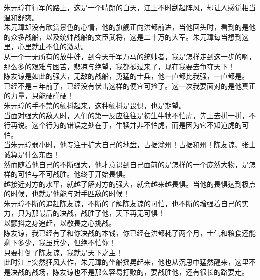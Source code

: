\begin{multicols}{\theparacolNo}
朱元璋在行军的路上，这是一个晴朗的白天，江上不时刮起阵风，却让人感觉相当温和舒爽。\\

朱元璋却没有欣赏景色的心情，他的旗舰正向洪都前进，当他回头时，看到的是他的众多战船，以及统帅战船的文臣武将，这是二十万的大军。朱元璋每当想到这里，心里就止不住的激动。\\

从一个一无所有的放牛娃，到今天千军万马的统帅者，我是怎样走到这一步的啊，那么多的艰难与困苦，悲凉与绝望，我都挺过来了，现在我要去争夺天下！\\

陈友谅是如此的强大，无敌的战船，勇猛的士兵，他一直都比我强，一直都是。\\

已经不是三年前了，已经没有伏击这样的便宜可捡了。这一次我要面对的是他真正的力量，只能硬碰硬！\\

朱元璋的手不禁的颤抖起来，这种颤抖是畏惧，也是期望。\\

当面对强大的敌人时，人们的第一反应往往是初生牛犊不怕虎，先上去拼一拼，不行再说。这个行为的错误之处在于，牛犊并非不怕虎，而是因为它不知道虎的可怕。\\

当朱元璋弱小时，他专注于扩大自己的地盘，占据滁州！占据和州！陈友谅、张士诚算是什么东西！\\

然而随着他自己的不断强大，他才意识到自己面前的是怎样的一个庞然大物，是怎样的可怕与不可战胜。他终于开始畏惧。\\

越接近对方的水平，就越了解对方的强大，就会越来越畏惧。当他的畏惧达到极点的时候，也就是他能与对手匹敌的时候！\\

朱元璋不断的追赶陈友谅，不断的了解陈友谅的可怕，也不断的增强着自己的实力，只为那最后的决战，战胜了他，天下再无可惧！\\

以颤抖之身追赶，以敬畏之心挑战。\\

陈友谅，我已经有了和你决战的本钱，你已经在洪都耗了两个月，士气和粮食还能剩下多少，我虽兵少，但绝不怕你！\\

只要打倒了陈友谅，我就是天下之主！\\

此时江上突然狂风大作，朱元璋的坐船摇晃起来，他也从沉思中猛然醒来，这里不是决战的战场，陈友谅也不是那么容易打败的，要战胜他，还有很长的路要走。\\


\end{multicols}
